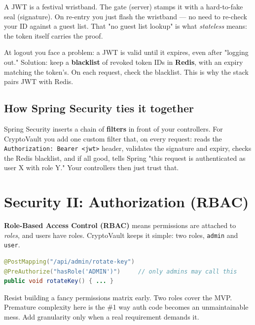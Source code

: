 \documentclass[11pt,a4paper]{article}
\begin{document}
\begin{analogy}
A JWT is a festival wristband. The gate (server) stamps it with a hard-to-fake seal (signature).
On re-entry you just flash the wristband — no need to re-check your ID against a guest list. That
"no guest list lookup" is what \emph{stateless} means: the token itself carries the proof.
\end{analogy}

\begin{whymatters}
At logout you face a problem: a JWT is valid until it expires, even after "logging out." Solution:
keep a \textbf{blacklist} of revoked token IDs in \textbf{Redis}, with an expiry matching the
token's. On each request, check the blacklist. This is why the stack pairs JWT with Redis.
\end{whymatters}

\subsection{How Spring Security ties it together}

Spring Security inserts a chain of \textbf{filters} in front of your controllers. For CryptoVault
you add one custom filter that, on every request: reads the \texttt{Authorization: Bearer <jwt>}
header, validates the signature and expiry, checks the Redis blacklist, and if all good, tells
Spring "this request is authenticated as user X with role Y." Your controllers then just trust that.

\section{Security II: Authorization (RBAC)}

\textbf{Role-Based Access Control (RBAC)} means permissions are attached to \emph{roles}, and users
have roles. CryptoVault keeps it simple: two roles, \texttt{admin} and \texttt{user}.

\begin{lstlisting}[language=Java]
@PostMapping("/api/admin/rotate-key")
@PreAuthorize("hasRole('ADMIN')")     // only admins may call this
public void rotateKey() { ... }
\end{lstlisting}

\begin{pitfall}
Resist building a fancy permissions matrix early. Two roles cover the MVP. Premature complexity
here is the \#1 way auth code becomes an unmaintainable mess. Add granularity only when a real
requirement demands it.
\end{pitfall}
\end{document}
